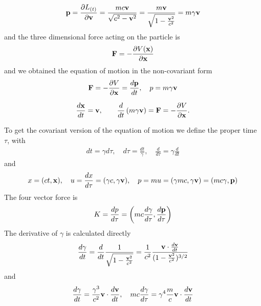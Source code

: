 \begin{align}
  {\bf p} = \frac{\partial L_{(t)}}{\partial {\bf v}}=\frac{mc{\bf v}}{\sqrt{c^2-{\bf v}^2}}=\frac{m{\bf v}}{\sqrt{1-\frac{{\bf v}^2}{c^2}}} = m\gamma {\bf v}
\end{align}
and the three dimensional force acting on the particle is
\begin{align}
  {\bf F} = -\frac{\partial V({\bf x})}{\partial {\bf x}}
\end{align}
and we obtained the equation of motion in the non-covariant form
\begin{align}
  & {\bf F}=-\frac{\partial V}{\partial{\bf x}}=\frac{d{\bf p}}{dt},\quad p=m\gamma {\bf v}\\
\end{align}
\begin{importantbox}
  \begin{align}
    \frac{d{\bf x}}{dt} = {\bf v},\qquad
    \frac{d}{dt}\left(m\gamma{\bf v}\right)={\bf F} = -\frac{\partial V}{\partial{\bf x}}.
  \end{align}
\end{importantbox}

To get the covariant version of the equation of motion we define the proper time $\tau$, with
\begin{align}
  dt = \gamma d \tau,\quad d\tau=\frac{dt}{\gamma},\quad \frac{d}{d\tau} = \gamma\frac{d}{dt}
\end{align}
and
\begin{align}
  x = (ct, {\bf x}),\quad u = \frac{dx}{d\tau}=(\gamma c, \gamma {\bf v}),\quad p = m u = (\gamma mc,\gamma{\bf v})=(mc\gamma,{\bf p})
\end{align}
The four vector force is
\begin{align}
  K = \frac{d p}{d\tau}=\left(mc\frac{d\gamma}{d\tau}, \frac{d{\bf p}}{d\tau}\right)
\end{align}
The derivative of $\gamma$ is calculated directly
\begin{align}
  \frac{d\gamma}{dt}=\frac{d}{dt}\frac1{\sqrt{1-\frac{{\bf v}^2}{c^2}}}=\frac1{c^2}\frac{{\bf v}\cdot\frac{d{\bf v}}{dt}}{(1-\frac{{\bf v}^2}{c^2})^{3/2}}
\end{align}
and
\begin{align}
  \frac{d\gamma}{dt} = \frac{\gamma^3}{c^2}{\bf v}\cdot\frac{d{\bf v}}{dt},\quad  mc\frac{d\gamma}{d\tau}=\gamma^4 \frac{m}c{\bf v}\cdot \frac{d{\bf v}}{dt}\label{dg}
\end{align}

